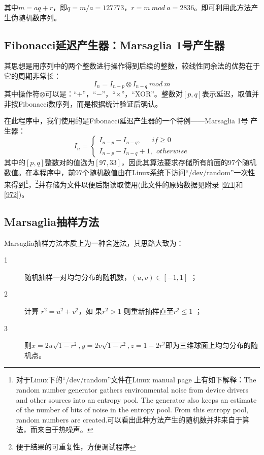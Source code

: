 \documentclass[a4paper,11pt]{article}
\begin{document}
其中$m=aq+r$，即$q=m/a=127773$，$r=m \ mod \ a=2836$。即可利用此方法产生伪随机数序列。

\subsection{Fibonacci延迟产生器：Marsaglia 1号产生器}
其思想是用序列中的两个整数进行操作得到后续的整数，较线性同余法的优势在于它的周期非常长：
\begin{equation}
	I_{n}=I_{n-p} \otimes I_{n-q} \ mod \  m
\end{equation}
其中操作符$\otimes$可以是：“$+$”，“$-$”，“$\times$”，“XOR”。整数对$[p,q]$表示延迟，取值并非按Fibonacci数序列，而是根据统计验证后确认。

在此程序中，我们使用的是Fibonacci延迟产生器的一个特例——Marsaglia 1号 产生器：
\begin{equation}
	I_{n}=\left\{
	\begin{array}{l}
		I_{n-p} - I_{n-q},  \ \ \ \ \ \ \ if \geq 0 \\
		I_{n-p} - I_{n-q}+1, \ \ otherwise
	\end{array}
	\right.
\end{equation}
其中的$[p,q]$整数对的值选为$[97,33]$，因此其算法要求存储所有前面的97个随机数值。在本程序中，前97个随机数值由在Linux系统下访问“/dev/random”一次性来得到\footnote{对于Linux下的“/dev/random”文件在Linux manual page 上有如下解释：The random number generator gathers environmental noise from device
       drivers and other sources into an entropy pool.  The generator also
       keeps an estimate of the number of bits of noise in the entropy pool.
       From this entropy pool, random numbers are created.可以看出此种方法产生的随机数并非来自于算法，而来自于热噪声。}，\footnote{便于结果的可重复性，方便调试程序}并存储为文件以便后期读取使用(此文件的原始数据见附录 \ref{971}和\ref{972})。



\subsection{Marsaglia抽样方法}
Marsaglia抽样方法本质上为一种舍选法，其思路大致为：
\begin{description} 
\item[1] 随机抽样一对均匀分布的随机数，$( u , v ) \in [ −1,1 ]$ ；
\item[2] 计算 $r^{2} = u^{2} + v^{2} $，如 果$ r^{2} > 1$ 则重新抽样直至$ r^{2} \leq 1$ ；
\item[3]则$x = 2u \sqrt{1 − r^{2} }, y = 2v \sqrt{1 − r^{2} }, z = 1 − 2r^{2} $即为三维球面上均匀分布的随机点。
\end{description}
\end{document}
